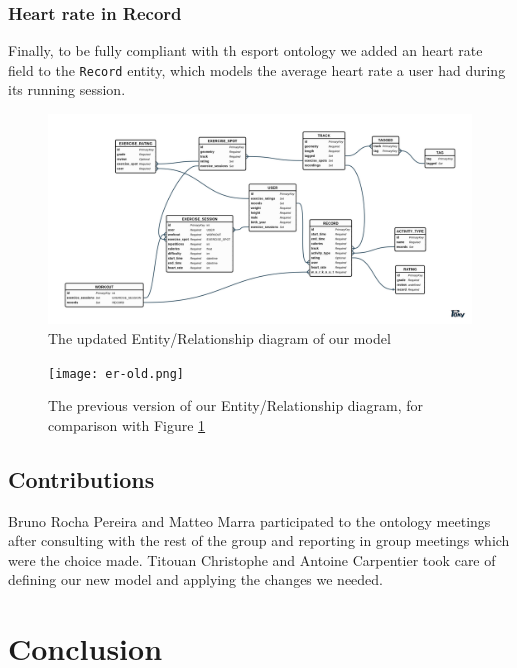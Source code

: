 \documentclass[a4paper]{article}
\begin{document}
\subsubsection{Heart rate in Record}
Finally, to be fully compliant with th esport ontology we added an heart rate field to the \texttt{Record} entity, which models the average heart rate a user had during its running session.


\begin{figure}
  \center
  \includegraphics[width=\textwidth]{er.png}
  \caption{\label{fig:new-er} The updated Entity/Relationship diagram of our model}
\end{figure}

\begin{figure}[h!]
  \center
  \texttt{[image: er-old.png]}
  \caption{\label{fig:old-er} The previous version of our Entity/Relationship diagram, for comparison with Figure \ref{fig:new-er}}
\end{figure}


\subsection{Contributions}
Bruno Rocha Pereira and Matteo Marra participated to the ontology meetings after consulting with the rest of the group and reporting in group meetings which were the choice made. 
Titouan Christophe and Antoine Carpentier took care of defining our new model and applying the changes we needed. 
\section{Conclusion}
\end{document}
